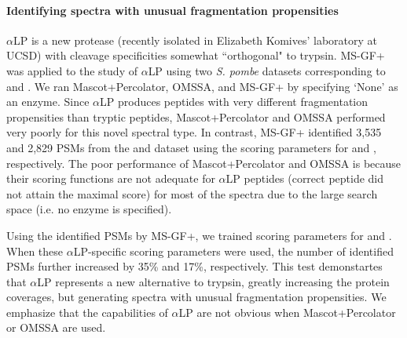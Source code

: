 \paragraph{Identifying spectra with unusual fragmentation propensities}

$\alpha$LP is a new protease (recently isolated in Elizabeth Komives' laboratory at UCSD)  with cleavage specificities somewhat ``orthogonal" to trypsin. 
MS-GF+ was applied to the study of $\alpha$LP using two {\em S. pombe} datasets corresponding to  and . 
We ran Mascot+Percolator, OMSSA, and MS-GF+ by specifying `None' as an enzyme.
Since $\alpha$LP produces peptides with very different fragmentation propensities than tryptic peptides, 
Mascot+Percolator and OMSSA performed very poorly for this novel spectral type.
In contrast, MS-GF+ identified 3,535 and 2,829 PSMs from the  and   dataset using the scoring parameters for  and , respectively.
The poor performance of Mascot+Percolator and OMSSA is because their scoring functions are not adequate for $\alpha$LP peptides (correct peptide did not attain the maximal score) for most of the spectra due to the large search space (i.e. no enzyme is specified).

Using the identified PSMs by MS-GF+, we trained scoring parameters for  and .
When these $\alpha$LP-specific scoring parameters were used, the number of identified PSMs further increased by 35\% and 17\%, respectively.
This test demonstartes that $\alpha$LP represents a new alternative to trypsin, greatly increasing the  protein  coverages,
but generating spectra with unusual fragmentation propensities.
We emphasize that the capabilities of $\alpha$LP are not obvious when Mascot+Percolator or OMSSA are used.


